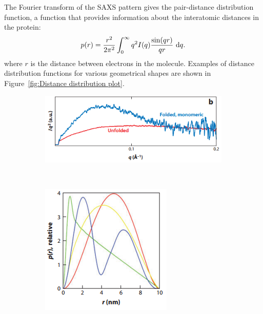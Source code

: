     The Fourier transform of the SAXS pattern gives the pair-distance distribution function, a function that provides information about the interatomic distances in the protein:
    \begin{equation}
        p(r) = \f{r^2}{2\pi^2}\int_0^{\infty}q^2 I(q) \f{\sin(qr)}{qr}\ \mathrm{d}q.
    \end{equation}
    where $r$ is the distance between electrons in the molecule.
    Examples of distance distribution functions for various geometrical shapes are shown in Figure~\ref{fig:Distance distribution plot}.
    \begin{figure}
        \centering
        \begin{subfigure}[b]{0.8\textwidth}
                \centering
                \includegraphics[width=\textwidth]{figures/introduction/kratkyplot.png}
                \caption{}
                \label{fig:Kratky plot}
        \end{subfigure}
        \\
        \begin{subfigure}[b]{0.6\textwidth}
                \centering
                \includegraphics[width=\textwidth]{figures/introduction/distancedistribution.png}

\end{subfigure}
\end{figure}
